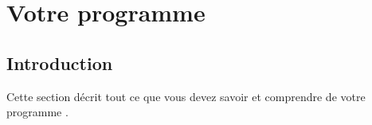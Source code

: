 % 
% 
% 
% 
% 
% 
% 
% 

\chapter{Votre programme}\hypertarget{program-unan}{}\label{program-unan}

\section{Introduction}\hypertarget{intro-program-unan}{}\label{intro-program-unan}

Cette section décrit tout ce que vous devez savoir et comprendre de votre programme \unan{}.

